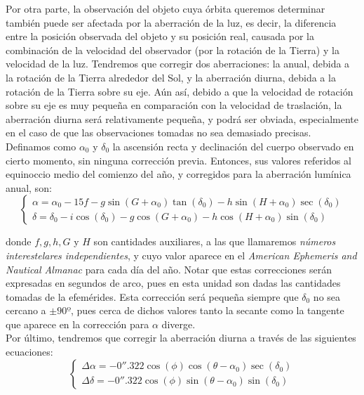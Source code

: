 \documentclass[11pt]{article}
\begin{document}
Por otra parte, la observación del objeto cuya órbita queremos determinar también puede ser afectada por la aberración de la luz, es decir, la diferencia entre la posición observada del objeto y su posición real, causada por la combinación de la velocidad del observador (por la rotación de la Tierra) y la velocidad de la luz. Tendremos que corregir dos aberraciones: la anual, debida a la rotación de la Tierra alrededor del Sol, y la aberración diurna, debida a la rotación de la Tierra sobre su eje. Aún así, debido a que la velocidad de rotación sobre su eje es muy pequeña en comparación con la velocidad de traslación, la aberración diurna será relativamente pequeña, y podrá ser obviada, especialmente en el caso de que las observaciones tomadas no sea demasiado precisas.\\

Definamos como $\alpha_0$ y $\delta_0$ la ascensión recta y declinación del cuerpo observado en cierto momento, sin ninguna corrección previa. Entonces, sus valores referidos al equinoccio medio del comienzo del año, y corregidos para la aberración lumínica anual, son:
\[
\left\{
\begin{array}{l}
	\alpha = \alpha_0 - 15f - g \sin(G+\alpha_0) \tan(\delta_0) - h \sin(H+\alpha_0) \sec(\delta_0)\\
	\delta = \delta_0 - i \cos(\delta_0) - g \cos(G+\alpha_0) - h \cos(H+\alpha_0) \sin(\delta_0)
\end{array}
\right.
\]

\noindent donde $f, g, h, G$ y $H$ son cantidades auxiliares, a las que llamaremos \textit{números interestelares independientes}, y cuyo valor aparece en el \textit{American Ephemeris and Nautical Almanac} para cada día del año. Notar que estas correcciones serán expresadas en segundos de arco, pues en esta unidad son dadas las cantidades tomadas de la efemérides. Esta corrección será pequeña siempre que $\delta_0$ no sea cercano a $\pm90º$, pues cerca de dichos valores tanto la secante como la tangente que aparece en la corrección para $\alpha$ diverge.\\

Por último, tendremos que corregir la aberración diurna a través de las siguientes ecuaciones:
\[
\left\{
\begin{array}{l}
	\Delta \alpha = -0''.322 \cos(\phi) \cos(\theta - \alpha_0) \sec(\delta_0)\\
	\Delta \delta = -0''.322 \cos(\phi) \sin(\theta - \alpha_0) \sin(\delta_0)
\end{array}
\right.
\]
\end{document}
